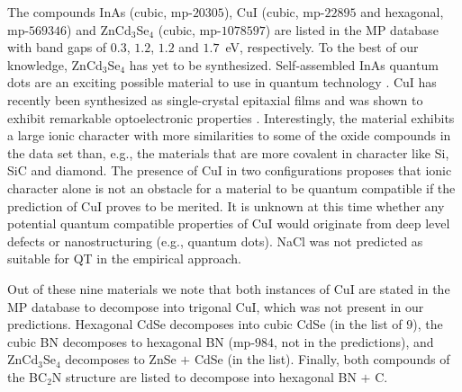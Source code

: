 \documentclass[superscriptaddress,unsortedaddress,
 amsmath,amssymb,
 aps,
]{revtex4-2}
\begin{document}
The compounds InAs (cubic, mp-$20305$), CuI (cubic, mp-$22895$ and hexagonal, mp-$569346$) and ZnCd$_3$Se$_4$ (cubic, mp-$1078597$) are listed in the MP database with band gaps of $0.3$, $1.2$, $1.2$ and $1.7$~eV, respectively. 
To the best of our knowledge, ZnCd$_3$Se$_4$ has yet to be synthesized. 
Self-assembled InAs quantum dots are an exciting possible material to use in quantum technology \cite{Liu2018}. 
CuI has recently been synthesized as single-crystal epitaxial films and was shown to exhibit remarkable optoelectronic properties \cite{Ahn2020}. Interestingly, the material exhibits a large ionic character with more similarities to some of the oxide compounds in the data set than, e.g., the materials that are more covalent in character like Si, SiC and  diamond.  
The presence of CuI in two configurations  proposes that ionic character alone is not an obstacle for a material to be quantum compatible if the prediction of CuI proves to be merited. It is unknown at this time whether any potential quantum compatible properties of CuI would originate from deep level defects or  nanostructuring (e.g., quantum dots). NaCl was not predicted as suitable for QT in the empirical approach.  

Out of these nine materials we note that both instances of CuI are stated in the MP database to decompose into trigonal CuI, which was not present in our predictions. Hexagonal CdSe decomposes into cubic CdSe (in the list of $9$), the cubic BN decomposes to hexagonal BN (mp-$984$, not in the predictions), and ZnCd$_3$Se$_4$ decomposes to ZnSe $+$ CdSe (in the list). Finally, both compounds of the BC$_2$N structure are listed to decompose into hexagonal BN $+$ C. 
\end{document}

